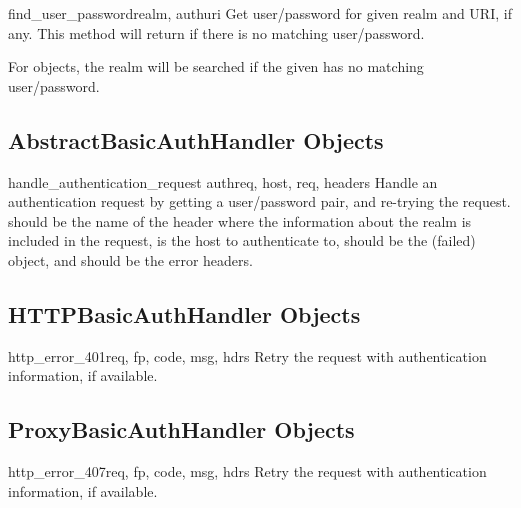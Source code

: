 \begin{methoddesc}[HTTPPasswordMgr]{find_user_password}{realm, authuri}
Get user/password for given realm and URI, if any.  This method will
return  if there is no matching user/password.

For  objects, the realm
 will be searched if the given  has no matching
user/password.
\end{methoddesc}


\subsection{AbstractBasicAuthHandler Objects
            \label{abstract-basic-auth-handler}}

\begin{methoddesc}[AbstractBasicAuthHandler]{handle_authentication_request}
                                            {authreq, host, req, headers}
Handle an authentication request by getting a user/password pair, and
re-trying the request.   should be the name of the header
where the information about the realm is included in the request,
 is the host to authenticate to,  should be the
(failed)  object, and  should be the error
headers.
\end{methoddesc}


\subsection{HTTPBasicAuthHandler Objects
            \label{http-basic-auth-handler}}

\begin{methoddesc}[HTTPBasicAuthHandler]{http_error_401}{req, fp, code, 
                                                        msg, hdrs}
Retry the request with authentication information, if available.
\end{methoddesc}


\subsection{ProxyBasicAuthHandler Objects
            \label{proxy-basic-auth-handler}}

\begin{methoddesc}[ProxyBasicAuthHandler]{http_error_407}{req, fp, code, 
                                                        msg, hdrs}
Retry the request with authentication information, if available.
\end{methoddesc}


